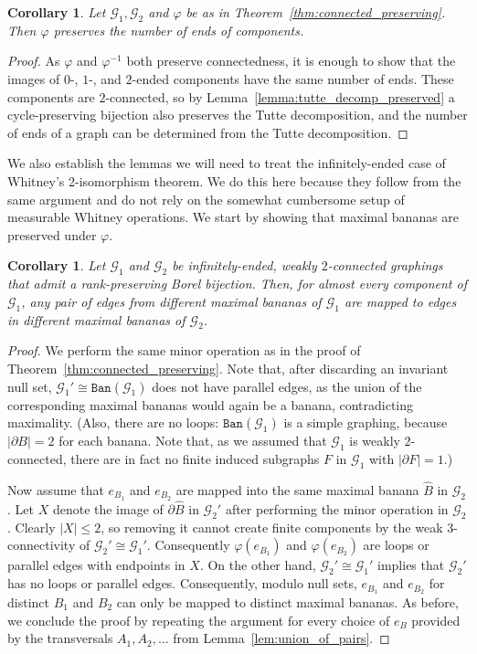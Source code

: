 \documentclass{article}
\theoremstyle{plain}
\newtheorem{cor}[thm]{Corollary}
\theoremstyle{definition}
\newcommand{\cG}{\mathcal{G}}
\newcommand{\fg}{\varphi}
\begin{document}
\begin{cor} \label{cor:preserve_no_ends}
    Let $\cG_1,\cG_2$ and $\fg$ be as in Theorem~\ref{thm:connected_preserving}. Then $\fg$ preserves the number of ends of components.
\end{cor}
\begin{proof}
    As $\fg$ and $\fg^{-1}$ both preserve connectedness, it is enough to show that the images of $0$-, $1$-, and $2$-ended components have the same number of ends. These components are $2$-connected, so by Lemma~\ref{lemma:tutte_decomp_preserved} a cycle-preserving bijection also preserves the Tutte decomposition, and the number of ends of a graph can be determined from the Tutte decomposition.
\end{proof}

We also establish the lemmas we will need to treat the infinitely-ended case of Whitney's 2-isomorphism theorem. We do this here because they follow from the same argument and do not rely on the somewhat cumbersome setup of measurable Whitney operations. We start by showing that maximal bananas are preserved under $\varphi$. 

\begin{cor}\label{cor:bananas_preserved}
    Let $\cG_1$ and $\cG_2$ be infinitely-ended, weakly $2$-connected graphings that admit a rank-preserving Borel bijection. Then, for almost every component of $\cG_1$, any pair of edges from different maximal bananas of $\cG_1$ are mapped to edges in different maximal bananas of $\cG_2$.
\end{cor}
\begin{proof}
    We perform the same minor operation as in the proof of Theorem~\ref{thm:connected_preserving}. Note that, after discarding an invariant null set, $\cG_1' \cong \texttt{Ban}(\cG_1)$ does not have parallel edges, as the union of the corresponding maximal bananas would again be a banana, contradicting maximality. (Also, there are no loops: $\texttt{Ban}(\cG_1)$ is a simple graphing, because $|\partial B|=2$ for each banana. Note that, as we assumed that $\cG_1$ is weakly $2$-connected, there are in fact no finite induced subgraphs $F$ in $\cG_1$ with $|\partial F|=1$.)  %

    Now assume that $e_{B_1}$ and $e_{B_2}$ are mapped into the same maximal banana $\hat{B}$ in $\cG_2$. Let $X$ denote the image of $\partial\hat{B}$ in $\cG_2'$ after performing the minor operation in $\cG_2$. Clearly $|X|\leq 2$, so removing it cannot create finite components by the weak $3$-connectivity of $\cG_2' \cong \cG_1'$. Consequently $\varphi(e_{B_1})$ and $\varphi(e_{B_2})$ are loops or parallel edges with endpoints in $X$. On the other hand, $\cG_2' \cong \cG_1'$ implies that $\cG_2'$ has no loops or parallel edges. Consequently, modulo null sets, $e_{B_1}$ and $e_{B_2}$ for distinct $B_1$ and $B_2$ can only be mapped to distinct maximal bananas. As before, we conclude the proof by repeating the argument for every choice of $e_B$ provided by the transversals $A_1,A_2, \dots$ from Lemma~\ref{lem:union_of_pairs}. %
\end{proof}
\end{document}
